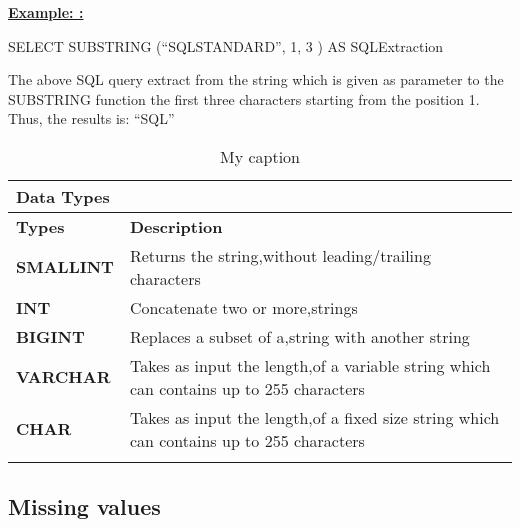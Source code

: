 \textbf{\underline{Example: :} }
\begin{mdframed}[backgroundcolor=gray!20][h] 
 SELECT SUBSTRING (“SQLSTANDARD”, 1, 3 ) AS SQLExtraction  
\end{mdframed}

The above SQL query extract from the string which is given as parameter to the SUBSTRING function the first three characters starting from the position 1. Thus, the results is: “SQL”

\begin{table}[h]
\centering
\caption{My caption}
\label{my-label}
\begin{tabular}{ll}
\hline
\multicolumn{2}{|l|}{\textbf{Data Types}}                                                                                                                                      \\ \hline
\multicolumn{1}{|l|}{\textbf{Types}}                           & \multicolumn{1}{l|}{\textbf{Description}}                                                                     \\ \hline
\multicolumn{1}{|l|}{{\color[HTML]{333333} \textbf{SMALLINT}}} & \multicolumn{1}{l|}{{\color[HTML]{333333} Returns the string,without leading/trailing characters}}            \\ \hline
\multicolumn{1}{|l|}{{\color[HTML]{333333} \textbf{INT}}}      & \multicolumn{1}{l|}{{\color[HTML]{333333} Concatenate two or more,strings}}                                   \\ \hline
\multicolumn{1}{|l|}{{\color[HTML]{333333} \textbf{BIGINT}}}   & \multicolumn{1}{l|}{{\color[HTML]{333333} Replaces a subset of a,string with another string}}                 \\ \hline
\multicolumn{1}{|l|}{\textbf{VARCHAR}}                         & \multicolumn{1}{l|}{Takes as input the length,of a variable string which can contains up to 255 characters}   \\ \hline
\multicolumn{1}{|l|}{\textbf{CHAR}}                            & \multicolumn{1}{l|}{Takes as input the length,of a fixed size string which can contains up to 255 characters} \\ \hline
                                                               &                                                                                                              
\end{tabular}
\end{table}

\subsection{Missing values} 

